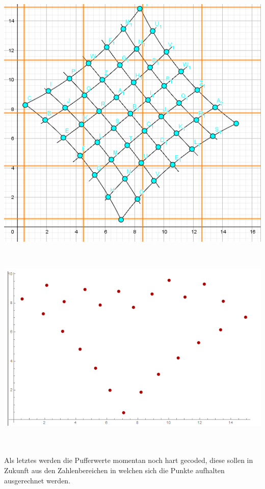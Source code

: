 \begin{minipage}{\linewidth}
	\centering
	\includegraphics[width=.8\linewidth]{images/extrBsp.png}
\end{minipage}\\

\begin{minipage}{\linewidth}
	\centering
	\includegraphics[width=1\linewidth]{images/AlgExtrBsp.png}
\end{minipage}\\\\


Als letztes werden die Pufferwerte momentan noch hart gecoded, diese sollen in Zukunft aus den Zahlenbereichen in welchen sich die Punkte aufhalten ausgerechnet werden.
